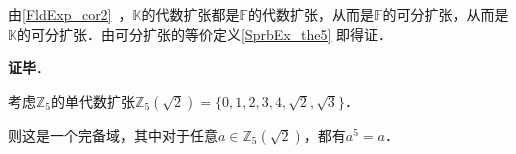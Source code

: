 












由\autoref{FldExp_cor2}~，$\mathbb{K}$的代数扩张都是$\mathbb{F}$的代数扩张，从而是$\mathbb{F}$的可分扩张，从而是$\mathbb{K}$的可分扩张．由可分扩张的等价定义\autoref{SprbEx_the5} 即得证．


\textbf{证毕}．


\begin{example}{}\label{SprbEx_ex3}
考虑$\mathbb{Z}_5$的单代数扩张$\mathbb{Z}_5(\sqrt{2})=\{0, 1, 2, 3, 4, \sqrt{2}, \sqrt{3}\}$．

则这是一个完备域，其中对于任意$a\in\mathbb{Z}_5(\sqrt{2})$，都有$a^5=a$．
\end{example}









































